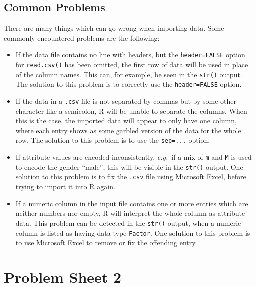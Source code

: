 \documentclass[
  a4paper,
]{article}
\theoremstyle{definition}
\theoremstyle{definition}
\theoremstyle{definition}
\theoremstyle{definition}
\theoremstyle{remark}
\begin{document}
\hypertarget{common-problems}{%
\subsection*{Common Problems}\label{common-problems}}

There are many things which can go wrong when importing data. Some commonly
encountered problems are the following:

\begin{itemize}
\item
  If the data file contains no line with headers, but the
  \texttt{header=FALSE} option for \texttt{read.csv()} has been omitted,
  the first row of data will be used in place of the column names.
  This can, for example, be seen in the \texttt{str()} output. The
  solution to this problem is to correctly use the
  \texttt{header=FALSE} option.
\item
  If the data in a \texttt{.csv} file is not separated by commas but
  by some other character like a semicolon, R will be unable to
  separate the columns. When this is the case, the imported data will
  appear to only have one column, where each entry shows as some
  garbled version of the data for the whole row. The solution to this
  problem is to use the \texttt{sep=...} option.
\item
  If attribute values are encoded inconsistently, \emph{e.g.}~if
  a mix of \texttt{m} and \texttt{M} is used to encode the gender
  ``male'', this will be visible in the \texttt{str()} output. One
  solution to this problem is to fix the \texttt{.csv} file using
  Microsoft Excel, before trying to import it into R again.
\item
  If a numeric column in the input file contains one or more
  entries which are neither numbers nor empty, R will interpret the
  whole column as attribute data. This problem can be detected in the
  \texttt{str()} output, when a numeric column is listed as having data
  type \texttt{Factor}. One solution to this problem is to use
  Microsoft Excel to remove or fix the offending entry.
\end{itemize}

\clearpage

\hypertarget{P02}{%
\section*{Problem Sheet 2}\label{P02}}
\end{document}
